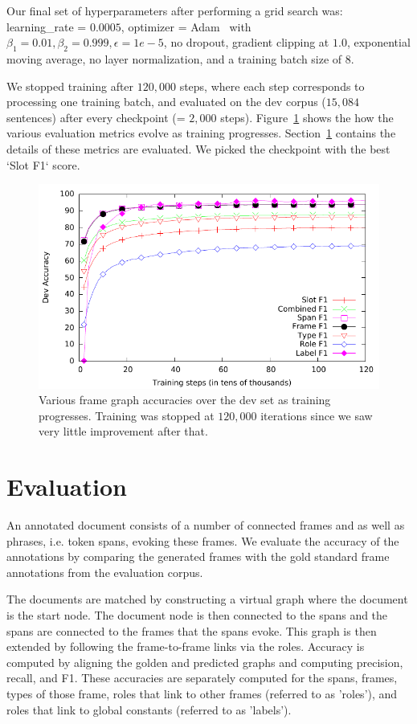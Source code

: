 \documentclass[11pt,a4paper]{article}
\begin{document}
 Our final set of hyperparameters after
performing a grid search was: learning\_rate = $0.0005$,
optimizer = Adam~\cite{kingma2014} with $\beta_1 = 0.01, \beta_2 = 0.999,
\epsilon = 1e-5$, no dropout, gradient clipping at $1.0$, exponential moving
average, no layer normalization, and a training batch size of $8$.

We stopped training after $120,000$ steps, where each step corresponds to
processing one training batch, and evaluated on the dev corpus
($15,084$ sentences) after every checkpoint (= $2,000$ steps).
Figure~\ref{fig:dev-eval} shows the how the various evaluation metrics evolve
as training progresses. Section~\ref{sec:eval} contains the details of these
metrics are evaluated. We picked the checkpoint with the best `Slot F1` score.

\begin{figure}
\centering
\includegraphics[width=\columnwidth]{dev-eval.pdf}
  \caption{Various frame graph accuracies over the dev set as training progresses.
	Training was stopped at $120,000$ iterations since we saw very little
	improvement after that.}
  \label{fig:dev-eval}
\end{figure}

\section{Evaluation}
\label{sec:eval}

An annotated document consists of a number of connected frames and as well as
phrases, i.e. token spans, evoking these frames. We evaluate the accuracy of the
annotations by comparing the generated frames with the gold standard frame
annotations from the evaluation corpus.

The documents are matched by constructing a virtual graph where the document
is the start node. The document node is then connected to the spans and the
spans are connected to the frames that the spans evoke. This graph is then
extended by following the frame-to-frame links via the roles. Accuracy is
computed by aligning the golden and predicted graphs and computing precision,
recall, and F1. These accuracies are separately computed for the spans, frames,
types of those frame, roles that link to other frames (referred to as 'roles'),
and roles that link to global constants (referred to as 'labels').
\end{document}
